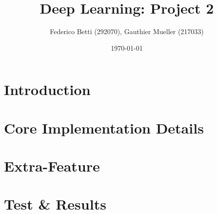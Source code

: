 \documentclass{article}
\title{Deep Learning: Project 2}
\date{\today}
\author{Federico Betti (292070), Gauthier Mueller (217033)}
\begin{document}
\maketitle
\tableofcontents
\thispagestyle{empty}
\clearpage

\setcounter{page}{1}
\section{Introduction}
\label{sect:Introduction}


\section{Core Implementation Details}
\label{sect:CoreImplementationDetails}


\section{Extra-Feature}
\label{sect:ExtraFeature}


\section{Test \& Results}
\label{sect:Results}

\end{document}
